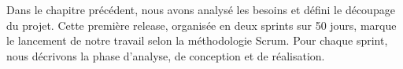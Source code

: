 Dans le chapitre précédent, nous avons analysé les besoins et défini le découpage du projet. Cette première release, organisée en deux sprints sur 50 jours, marque le lancement de notre travail selon la méthodologie Scrum. Pour chaque sprint, nous décrivons la phase d’analyse, de conception et de
réalisation.
